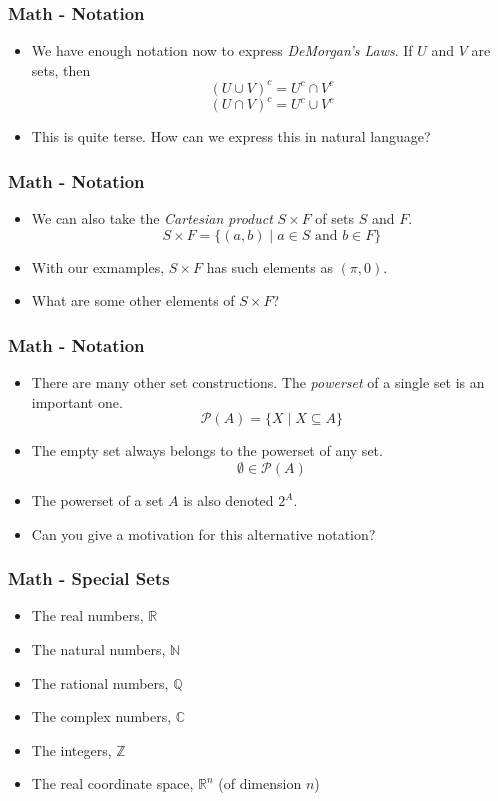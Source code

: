 \documentclass{beamer}
\newcommand{\R}{\mathbb{R}}
\newcommand{\Z}{\mathbb{Z}}
\newcommand{\Q}{\mathbb{Q}}
\newcommand{\N}{\mathbb{N}}
\newcommand{\C}{\mathbb{C}}
\begin{document}
\frame
{
\frametitle{Math - Notation}
\begin{itemize}[<+->]
\item We have enough notation now to express \emph{DeMorgan's Laws}. If $U$ and $V$ are sets, then 
\[ (U \cup V)^c = U^c \cap V^c \] 
\[ (U \cap V)^c = U^c \cup V^c \]
\item This is quite terse. How can we express this in natural language? 
\end{itemize}
}



\frame
{
\frametitle{Math - Notation}
\begin{itemize}[<+->]
\item We can also take the \emph{Cartesian product} $S \times F$ of sets $S$ and $F$.
\[ S \times F = \{(a,b) \mid a \in S \text{ and } b \in F\}\]
\item With our exmamples, $S \times F$ has such elements as $(\pi, 0)$.
\item What are some other elements of $S \times F$?
\end{itemize}
}

\frame
{
\frametitle{Math - Notation}
\begin{itemize}[<+->]
\item There are many other set constructions. The \emph{powerset} of a single set is an important one. 
\[\mathcal{P}(A) =  \{ X \mid X \subseteq A\} \]
\item The empty set always belongs to the powerset of any set.
\[ \emptyset \in \mathcal{P}(A)\]
\item The powerset of a set $A$ is also denoted $2^A$.
\item Can you give a motivation for this alternative notation?
\end{itemize}
}

\frame
{
\frametitle{Math - Special Sets}
\begin{itemize}[<+->]
\item The real numbers, $\R$
\item The natural numbers, $\N$
\item The rational numbers, $\Q$
\item The complex numbers, $\C$
\item The integers, $\Z$
\item The real coordinate space, $\R^n$ (of dimension $n$)
\end{itemize}
}
\end{document}
